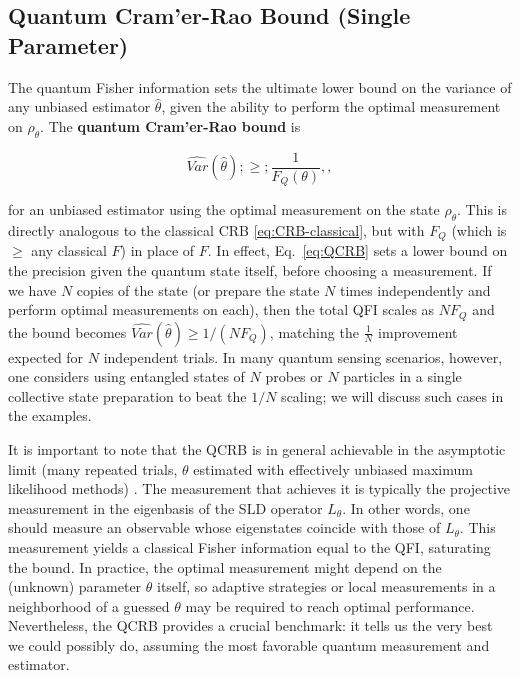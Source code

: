\subsection{Quantum Cram'er-Rao Bound (Single Parameter)}



The quantum Fisher information sets the ultimate lower bound on the
variance of any unbiased estimator $\hat{\theta}$, given the ability
to perform the optimal measurement on $\rho_\theta$. The
\textbf{quantum Cram'er-Rao bound} is

\begin{equation}
\widehat{Var}(\hat{\theta}) ;\ge; \frac{1}{F_Q(\theta)} ,,
\label{eq:QCRB}
\end{equation}

for an unbiased estimator using the optimal measurement on the state
$\rho_\theta$. This is directly analogous to the classical CRB
\eqref{eq:CRB-classical}, but with $F_Q$ (which is $\ge$ any classical
$F$) in place of $F$. In effect, Eq.~\eqref{eq:QCRB} sets a lower
bound on the precision given the quantum state itself, before choosing
a measurement. If we have $N$ copies of the state (or prepare the
state $N$ times independently and perform optimal measurements on
each), then the total QFI scales as $N F_Q$ and the bound becomes
$\widehat{Var}(\hat{\theta}) \ge 1/(N F_Q)$, matching the $\frac{1}{N}$
improvement expected for $N$ independent trials. In many quantum
sensing scenarios, however, one considers using entangled states of
$N$ probes or $N$ particles in a single collective state preparation
to beat the $1/N$ scaling; we will discuss such cases in the examples.



It is important to note that the QCRB is in general achievable in the
asymptotic limit (many repeated trials, $\theta$ estimated with
effectively unbiased maximum likelihood methods)
\cite{BraunsteinCaves1994, Helstrom1976}. The measurement that
achieves it is typically the projective measurement in the eigenbasis
of the SLD operator $L_\theta$. In other words, one should measure an
observable whose eigenstates coincide with those of $L_\theta$. This
measurement yields a classical Fisher information equal to the QFI,
saturating the bound. In practice, the optimal measurement might
depend on the (unknown) parameter $\theta$ itself, so adaptive
strategies or local measurements in a neighborhood of a guessed
$\theta$ may be required to reach optimal performance. Nevertheless,
the QCRB provides a crucial benchmark: it tells us the very best we
could possibly do, assuming the most favorable quantum measurement and
estimator.




